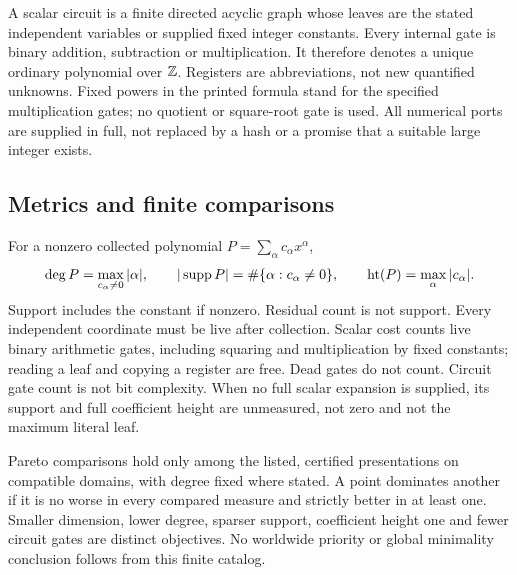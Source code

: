A scalar circuit is a finite directed acyclic graph whose leaves are the
stated independent variables or supplied fixed integer constants. Every
internal gate is binary addition, subtraction or multiplication. It therefore
denotes a unique ordinary polynomial over $\mathbb Z$. Registers are abbreviations,
not new quantified unknowns. Fixed powers in the printed formula stand for
the specified multiplication gates; no quotient or square-root gate is used.
All numerical ports are supplied in full, not replaced by a hash or a
promise that a suitable large integer exists.

\subsection{Metrics and finite comparisons}
For a nonzero collected polynomial $P=\sum_\alpha c_\alpha x^\alpha$,
\[
 \deg P=\max_{c_\alpha\ne0}|\alpha|,\qquad
 |\operatorname{supp} P|=\#\{\alpha:c_\alpha\ne0\},\qquad
 \operatorname{ht}(P)=\max_\alpha|c_\alpha|.
\]
Support includes the constant if nonzero. Residual count is not support.
Every independent coordinate must be live after collection. Scalar cost
counts live binary arithmetic gates, including squaring and multiplication
by fixed constants; reading a leaf and copying a register are free. Dead
gates do not count. Circuit gate count is not bit complexity. When no full
scalar expansion is supplied, its support and full coefficient height are
unmeasured, not zero and not the maximum literal leaf.

Pareto comparisons hold only among the listed, certified presentations on
compatible domains, with degree fixed where stated. A point dominates
another if it is no worse in every compared measure and strictly better in
at least one. Smaller dimension, lower degree, sparser support, coefficient
height one and fewer circuit gates are distinct objectives. No worldwide
priority or global minimality conclusion follows from this finite catalog.

